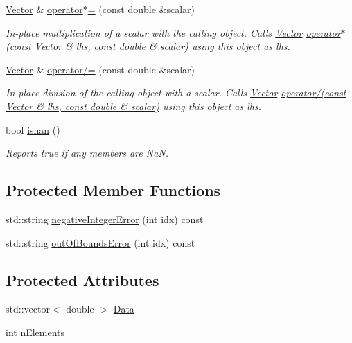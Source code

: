\begin{DoxyCompactItemize}
\hyperlink{classJSL_1_1Vector}{Vector} \& \hyperlink{classJSL_1_1Vector_ad2fb2b88e3447881c1dac08897c5c8a8}{operator$\ast$=} (const double \&scalar)
\begin{DoxyCompactList}\small\item\em In-\/place multiplication of a scalar with the calling object. Calls \hyperlink{classJSL_1_1Vector}{Vector} \hyperlink{namespaceJSL_afc5e092de4a9bdc5795d40ee0f51c7b9}{operator$\ast$(const Vector \& lhs, const double \& scalar)} using this object as lhs. \end{DoxyCompactList}\item 
\hyperlink{classJSL_1_1Vector}{Vector} \& \hyperlink{classJSL_1_1Vector_a0ce3dc2b4c99dbe6acdec350e2f46ab6}{operator/=} (const double \&scalar)
\begin{DoxyCompactList}\small\item\em In-\/place division of the calling object with a scalar. Calls \hyperlink{classJSL_1_1Vector}{Vector} \hyperlink{namespaceJSL_a1427fd44260592b7d65d27946969fba1}{operator/(const Vector \& lhs, const double \& scalar)} using this object as lhs. \end{DoxyCompactList}\item 
bool \hyperlink{classJSL_1_1Vector_ad7dc3af5e90b59e3ba2efc458e192a4c}{isnan} ()
\begin{DoxyCompactList}\small\item\em Reports true if any members are NaN. \end{DoxyCompactList}\end{DoxyCompactItemize}
\subsection*{Protected Member Functions}
\begin{DoxyCompactItemize}
\item 
std\+::string \hyperlink{classJSL_1_1Vector_ac41d3cb075c2bd871c31b96dedba08fe}{negative\+Integer\+Error} (int idx) const
\item 
std\+::string \hyperlink{classJSL_1_1Vector_ab081a68e1fc526f4bf866de0ba61a09b}{out\+Of\+Bounds\+Error} (int idx) const
\end{DoxyCompactItemize}
\subsection*{Protected Attributes}
\begin{DoxyCompactItemize}
\item 
std\+::vector$<$ double $>$ \hyperlink{classJSL_1_1Vector_aec102ab8391080ddaedeb4605ef40c5c}{Data}
\item 
int \hyperlink{classJSL_1_1Vector_a84eb32f5917a770c895e106834a6c05d}{n\+Elements}
\end{DoxyCompactItemize}


